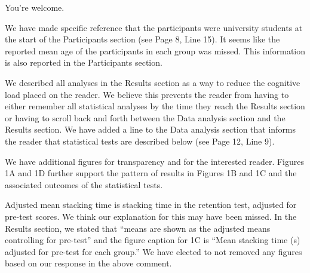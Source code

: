 \documentclass[final]{article}
\begin{document}

You're welcome.


We have made specific reference that the participants were university students at the start of the Participants section (see Page 8, Line 15). It seems like the reported mean age of the participants in each group was missed. This information is also reported in the Participants section.


We described all analyses in the Results section as a way to reduce the cognitive load placed on the reader. We believe this prevents the reader from having to either remember all statistical analyses by the time they reach the Results section or having to scroll back and forth between the Data analysis section and the Results section. We have added a line to the Data analysis section that informs the reader that statistical tests are described below (see Page 12, Line 9).


We have additional figures for transparency and for the interested reader. Figures 1A and 1D further support the pattern of results in Figures 1B and 1C and the associated outcomes of the statistical tests.


Adjusted mean stacking time is stacking time in the retention test, adjusted for pre-test scores. We think our explanation for this may have been missed. In the Results section, we stated that ``means are shown as the adjusted means controlling for pre-test'' and the figure caption for 1C is ``Mean stacking time (s) adjusted for pre-test for each group.'' We have elected to not removed any figures based on our response in the above comment.

\end{document}
